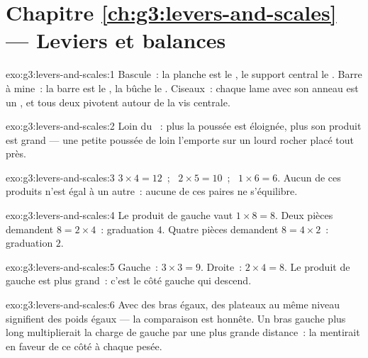 \section*{Chapitre \ref{ch:g3:levers-and-scales} --- Leviers et balances}

\begin{solution}{exo:g3:levers-and-scales:1}
Bascule~: la planche est le , le support central le .
Barre à mine~: la barre est le , la bûche le . Ciseaux~:
chaque lame avec son anneau est un , et tous deux pivotent
autour de la vis centrale.
\end{solution}

\begin{solution}{exo:g3:levers-and-scales:2}
Loin du ~: plus la poussée est éloignée, plus son produit est
grand --- une petite poussée de loin l'emporte sur un lourd rocher
placé tout près.
\end{solution}

\begin{solution}{exo:g3:levers-and-scales:3}
$3 \times 4 = 12$~; \ $2 \times 5 = 10$~; \ $1 \times 6 = 6$. Aucun de
ces produits n'est égal à un autre~: aucune de ces paires ne
s'équilibre.
\end{solution}

\begin{solution}{exo:g3:levers-and-scales:4}
Le produit de gauche vaut $1 \times 8 = 8$. Deux pièces demandent
$8 = 2 \times 4$~: graduation $4$. Quatre pièces demandent
$8 = 4 \times 2$~: graduation $2$.
\end{solution}

\begin{solution}{exo:g3:levers-and-scales:5}
Gauche~: $3 \times 3 = 9$. Droite~: $2 \times 4 = 8$. Le produit de
gauche est plus grand~: c'est le côté gauche qui descend.
\end{solution}

\begin{solution}{exo:g3:levers-and-scales:6}
Avec des bras égaux, des plateaux au même niveau signifient des poids
égaux --- la comparaison est honnête. Un bras gauche plus long
multiplierait la charge de gauche par une plus grande distance~: la
 mentirait en faveur de ce côté à chaque pesée.
\end{solution}

